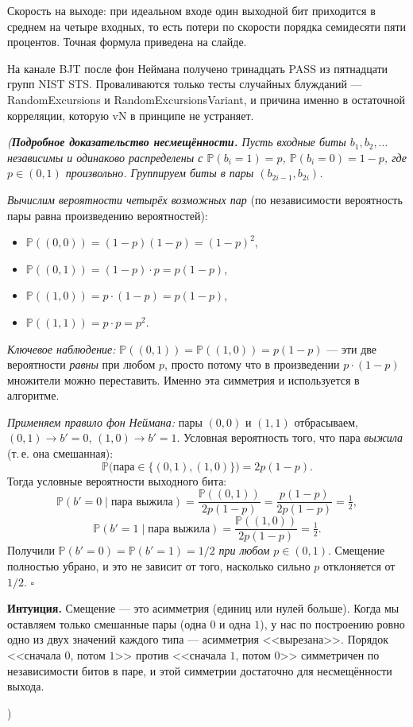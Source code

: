 \documentclass[12pt,a4paper]{extarticle}
\newcommand{\note}[1]{%
  \par
  {\small\color{noteclr}\itshape (#1)}%
  \par}
\begin{document}
Скорость на выходе: при идеальном входе один выходной бит приходится в
среднем на четыре входных, то есть потери по скорости порядка семидесяти
пяти процентов. Точная формула приведена на слайде.

На канале BJT после фон Неймана получено тринадцать PASS из пятнадцати
групп NIST STS. Проваливаются только тесты случайных блужданий ---
RandomExcursions и RandomExcursionsVariant, и причина именно в остаточной
корреляции, которую vN в принципе не устраняет.

\note{\textbf{Подробное доказательство несмещённости.}
Пусть входные биты $b_1, b_2, \ldots$ независимы и одинаково распределены
с $\mathbb{P}(b_i = 1) = p$, $\mathbb{P}(b_i = 0) = 1-p$, где $p \in (0,1)$
произвольно. Группируем биты в пары $(b_{2i-1}, b_{2i})$.

\emph{Вычислим вероятности четырёх возможных пар} (по независимости
вероятность пары равна произведению вероятностей):
\begin{itemize}
  \setlength{\itemsep}{0.1em}
  \item $\mathbb{P}((0,0)) = (1-p)(1-p) = (1-p)^2$,
  \item $\mathbb{P}((0,1)) = (1-p)\cdot p = p(1-p)$,
  \item $\mathbb{P}((1,0)) = p\cdot(1-p) = p(1-p)$,
  \item $\mathbb{P}((1,1)) = p\cdot p = p^2$.
\end{itemize}

\emph{Ключевое наблюдение:} $\mathbb{P}((0,1)) = \mathbb{P}((1,0)) = p(1-p)$
--- эти две вероятности \emph{равны} при любом $p$, просто потому что в
произведении $p\cdot(1-p)$ множители можно переставить. Именно эта симметрия
и используется в алгоритме.

\emph{Применяем правило фон Неймана:} пары $(0,0)$ и $(1,1)$ отбрасываем,
$(0,1)\to b'=0$, $(1,0)\to b'=1$. Условная вероятность того, что пара
\emph{выжила} (т.\,е. она смешанная):
\[
  \mathbb{P}\bigl(\text{пара}\in\{(0,1),(1,0)\}\bigr) = 2p(1-p).
\]
Тогда условные вероятности выходного бита:
\[
  \mathbb{P}(b'=0 \mid \text{пара выжила}) =
  \frac{\mathbb{P}((0,1))}{2p(1-p)} = \frac{p(1-p)}{2p(1-p)} = \tfrac12,
\]
\[
  \mathbb{P}(b'=1 \mid \text{пара выжила}) =
  \frac{\mathbb{P}((1,0))}{2p(1-p)} = \tfrac12.
\]
Получили $\mathbb{P}(b'=0) = \mathbb{P}(b'=1) = 1/2$ \emph{при любом}
$p \in (0,1)$. Смещение полностью убрано, и это не зависит от того,
насколько сильно $p$ отклоняется от $1/2$. $\square$

\medskip
\textbf{Интуиция.} Смещение --- это асимметрия (единиц или нулей больше).
Когда мы оставляем только смешанные пары (одна $0$ и одна $1$), у нас
по построению ровно одно из двух значений каждого типа --- асимметрия
<<вырезана>>. Порядок <<сначала $0$, потом $1$>> против <<сначала $1$,
потом $0$>> симметричен по независимости битов в паре, и этой симметрии
достаточно для несмещённости выхода.

}
\end{document}
